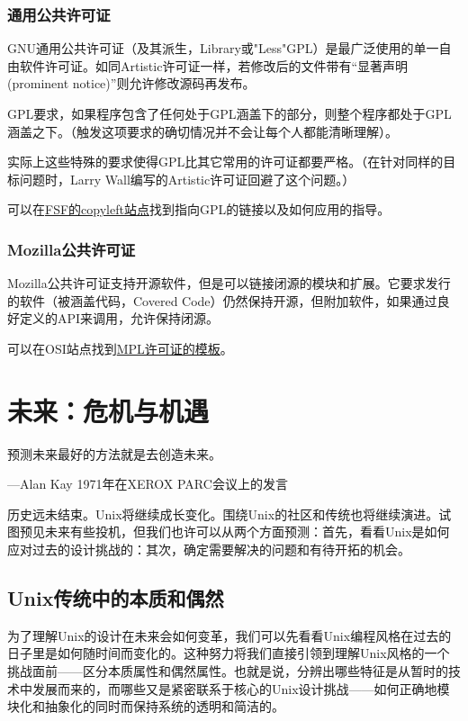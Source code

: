 \documentclass[12pt,oneside]{ctexbook}
\begin{document}
\begin{common-format}
\subsection{通用公共许可证}
GNU通用公共许可证（及其派生，Library或"Less"GPL）是最广泛使用的单一自由软件许可证。如同Artistic许可证一样，若修改后的文件带有“显著声明(prominent notice)”则允许修改源码再发布。

GPL要求，如果程序包含了任何处于GPL涵盖下的部分，则整个程序都处于GPL涵盖之下。（触发这项要求的确切情况并不会让每个人都能清晰理解）。

实际上这些特殊的要求使得GPL比其它常用的许可证都要严格。（在针对同样的目标问题时，Larry Wall编写的Artistic许可证回避了这个问题。）

可以在\href{http://www.gnu.org/copyleft.html}{FSF的copyleft站点}找到指向GPL的链接以及如何应用的指导。

\subsection{Mozilla公共许可证}
Mozilla公共许可证支持开源软件，但是可以链接闭源的模块和扩展。它要求发行的软件（被涵盖代码，Covered Code）仍然保持开源，但附加软件，如果通过良好定义的API来调用，允许保持闭源。

可以在OSI站点找到\href{http://www.opensource.org/licenses/MPL-1.1.html}{MPL许可证的模板}。


\chapter{未来：危机与机遇}
\begin{flushright}
\begin{notecard}{15em}
预测未来最好的方法就是去创造未来。

{\hfill —Alan Kay 1971年在XEROX PARC会议上的发言}
\end{notecard}
\end{flushright}

历史远未结束。Unix将继续成长变化。围绕Unix的社区和传统也将继续演进。试图预见未来有些投机，但我们也许可以从两个方面预测：首先，看看Unix是如何应对过去的设计挑战的：其次，确定需要解决的问题和有待开拓的机会。

\section{Unix传统中的本质和偶然}
为了理解Unix的设计在未来会如何变革，我们可以先看看Unix编程风格在过去的日子里是如何随时间而变化的。这种努力将我们直接引领到理解Unix风格的一个挑战面前——区分本质属性和偶然属性。也就是说，分辨出哪些特征是从暂时的技术中发展而来的，而哪些又是紧密联系于核心的Unix设计挑战——如何正确地模块化和抽象化的同时而保持系统的透明和简洁的。


\end{common-format}
\end{document}
